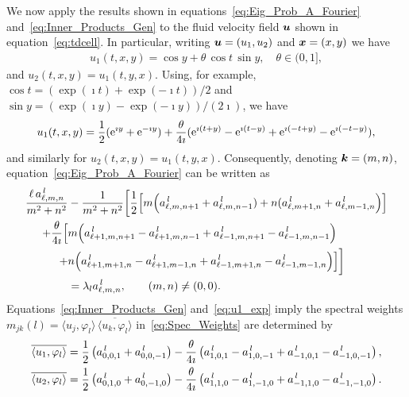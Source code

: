 \documentclass[amsa]{ipart}
\begin{document}
We now apply the results shown in
equations~\eqref{eq:Eig_Prob_A_Fourier}  
and~\eqref{eq:Inner_Products_Gen} to the fluid velocity field
$\boldsymbol{u}$ shown in equation~\eqref{eq:tdcell}. In particular, writing
$\boldsymbol{u}=(u_1,u_2)$ and $\boldsymbol{x}=(x,y)$ we have 
%
\begin{align}
  u_1(t,x,y)=\cos{y}+\theta\,\cos{t}\,\sin{y},
  \quad
  \theta \in (0,1],
\end{align}
%
and $u_2(t,x,y)=u_1(t,y,x)$. Using, for example, $\cos{t}=(\exp(\imath
t)+\exp(-\imath t))/2$ and $\sin{y}=(\exp(\imath y)-\exp(-\imath y))/(2\imath)$, we have   
%
\begin{align}\label{eq:u1_exp}
  u_1(t,x,y)=\frac{1}{2}(\e^{\imath y}+\e^{-\imath y})
           +\frac{\theta}{4\imath}(\e^{\imath(t+y)}-\e^{\imath(t-y)}+\e^{\imath(-t+y)}-\e^{\imath (-t-y)}),
\end{align}
%
and similarly for $u_2(t,x,y)=u_1(t,y,x)$. Consequently, denoting
$\boldsymbol{k}=(m,n)$, equation~\eqref{eq:Eig_Prob_A_Fourier} can be written
as 
%
\begin{align}\label{eq:Fourier_Coef_System}
 \frac{\ell\,a^{\,l}_{\ell,m,n}}{m^2+n^2}
 &-\frac{1}{m^2+n^2}
 \bigg[
 \frac{1}{2}
 \Big[m\Big(a^{\,l}_{\ell,m,n+1}+a^{\,l}_{\ell,m,n-1})+n(a^{\,l}_{\ell,m+1,n}+a^{\,l}_{\ell,m-1,n}\Big)\Big]
\\
+\frac{\theta}{4\imath}
\Big[
&m\Big(a^{\,l}_{\ell+1,m,n+1}-a^{\,l}_{\ell+1,m,n-1}+a^{\,l}_{\ell-1,m,n+1}-a^{\,l}_{\ell-1,m,n-1}\Big)
\notag\\
+&n\Big(a^{\,l}_{\ell+1,m+1,n}-a^{\,l}_{\ell+1,m-1,n}+a^{\,l}_{\ell-1,m+1,n}-a^{\,l}_{\ell-1,m-1,n}\Big)
\Big]
\bigg]
\notag\\
&=\lambda_la^{\,l}_{\ell,m,n}, \qquad (m,n)\neq(0,0).
\notag
\end{align}
%
Equations~\eqref{eq:Inner_Products_Gen}
and~\eqref{eq:u1_exp} 
imply the spectral weights
$m_{jk}(l)=\langle u_j,\varphi_l\rangle\,\overline{\langle u_k,\varphi_l\rangle}$ in~\eqref{eq:Spec_Weights}
are determined by   
%
\begin{align}\label{eq:Inner_Products_2D}
  \overline{\langle u_1,\varphi_l\rangle}
  =\frac{1}{2}\left(a^{\,l}_{0,0,1}+a^{\,l}_{0,0,-1}\right)
      -\frac{\theta}{4\imath}\left(a^{\,l}_{1,0,1}-a^{\,l}_{1,0,-1}+a^{\,l}_{-1,0,1}-a^{\,l}_{-1,0,-1}\right), 
               \\
  \overline{\langle u_2,\varphi_l\rangle}=\frac{1}{2}\left(a^{\,l}_{0,1,0}+a^{\,l}_{0,-1,0}\right)
       -\frac{\theta}{4\imath}\left(a^{\,l}_{1,1,0}-a^{\,l}_{1,-1,0}+a^{\,l}_{-1,1,0}-a^{\,l}_{-1,-1,0}\right).
               \notag
\end{align}
\end{document}

